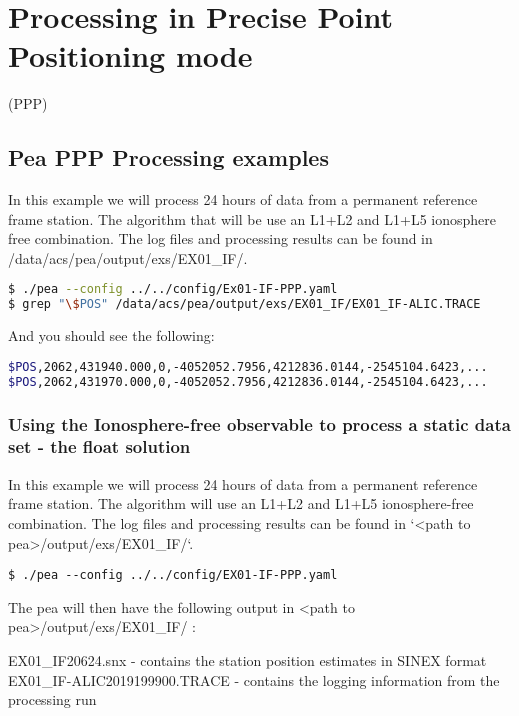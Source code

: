\chapter{Processing in Precise Point Positioning mode}

(PPP)

\section{Pea PPP Processing examples}
In this example we will process 24 hours of data from a permanent reference frame station. The algorithm that will be use an L1+L2 and L1+L5 ionosphere free combination. The log files and processing results can be found in /data/acs/pea/output/exs/EX01\_IF/.

\begin{lstlisting}[language=bash]
$ ./pea --config ../../config/Ex01-IF-PPP.yaml
$ grep "\$POS" /data/acs/pea/output/exs/EX01_IF/EX01_IF-ALIC.TRACE
\end{lstlisting}

And you should see the following: 
\begin{lstlisting}[language=bash] 
$POS,2062,431940.000,0,-4052052.7956,4212836.0144,-2545104.6423,...
$POS,2062,431970.000,0,-4052052.7956,4212836.0144,-2545104.6423,...
\end{lstlisting}


\subsection{Using the Ionosphere-free observable to process a static data set - the float solution}

In this example we will process 24 hours of data from a permanent reference frame station. The algorithm will use an L1+L2 and L1+L5 ionosphere-free combination.
The log files and processing results can be found in `<path to pea>/output/exs/EX01\_IF/`.
\begin{lstlisting}
$ ./pea --config ../../config/EX01-IF-PPP.yaml
\end{lstlisting}
The pea will then have the following output in <path to pea>/output/exs/EX01\_IF/ :

EX01\_IF20624.snx              - contains the station position estimates in SINEX format
EX01\_IF-ALIC2019199900.TRACE  - contains the logging information from the processing run


